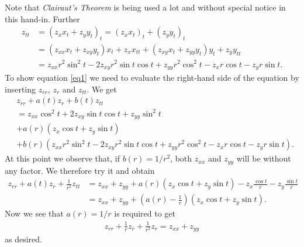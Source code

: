 \documentclass{article}
\begin{document}
Note that \emph{Clairaut's Theorem} is being used a lot and without special notice in this hand-in. Further
\begin{align*}
  z_{tt} &= (z_x x_t + z_y y_t)_t = (z_x x_t)_t + (z_y y_t)_t\\
  &=(z_{xx}x_t + z_{xy}y_t)x_t + z_x x_{tt}
  + (z_{xy}x_t + z_{yy}y_t)y_t + z_y y_{tt}\\
  &= z_{xx}r^2\sin^2 t - 2z_{xy}r^2\sin t\cos t + z_{yy}r^2\cos^2 t -z_x r\cos t - z_y r\sin t.
\end{align*}
To show equation \ref{eq1} we need to evaluate the right-hand side of the equation by inserting
$z_{rr}$, $z_r$ and $z_{tt}$. We get
\begin{align*}
  &z_{rr} + a(t)z_r + b(t)z_{tt}\\
  &=z_{xx}\cos^2 t + 2 z_{xy}\sin t\cos t + z_{yy}\sin^2 t\\
  &+a(r)\left(z_x \cos t + z_y \sin t\right)\\
  &+b(r)\left(z_{xx}r^2\sin^2 t - 2z_{xy}r^2\sin t\cos t + z_{yy}r^2\cos^2 t-z_x r\cos t - z_y r\sin t\right).
\end{align*}
At this point we observe that, if $b(r)=1/r^2$, both $z_{xx}$ and $z_{yy}$ will
be without any factor. We therefore try it and obtain
\begin{align*}
  z_{rr} + a(t)z_r + \frac{1}{r^2}z_{tt} &= z_{xx}+z_{yy} + a(r)(z_x\cos t + z_y\sin t)
  -z_x\frac{\cos t}{r}-z_y \frac{\sin t}{r}\\
  &= z_{xx}+z_{yy} + \left(a(r)-\frac{1}{r}\right)(z_x\cos t+z_y \sin t).
\end{align*}
Now we see that $a(r)=1/r$ is required to get
\begin{align*}
  z_{rr} + \frac{1}{r}z_r + \frac{1}{r^2}z_r = z_{xx} + z_{yy}
\end{align*}
as desired.
\end{document}
